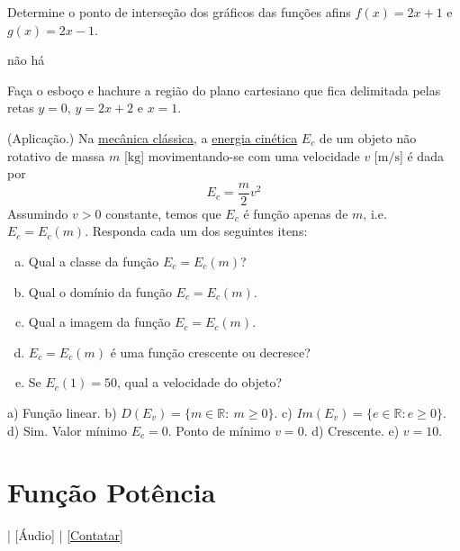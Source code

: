 \begin{exer}
  Determine o ponto de interseção dos gráficos das funções afins $f(x) = 2x + 1$ e $g(x) = 2x -1$.
\end{exer}
\begin{resp}
  não há
\end{resp}

\begin{exer}\label{exer:delim}
  Faça o esboço e hachure a região do plano cartesiano que fica delimitada pelas retas $y=0$, $y=2x+2$ e $x=1$.
\end{exer}

\begin{exer}(Aplicação.)
  Na \href{https://pt.wikipedia.org/wiki/Mec\%C3\%A2nica\_cl\%C3\%A1ssica}{mecânica clássica}, a \href{https://pt.wikipedia.org/wiki/Energia_cin\%C3\%A9tica}{energia cinética} $E_c$ de um objeto não rotativo de massa $m$ [$\text{kg}$] movimentando-se com uma velocidade $v$ [$\text{m}/\text{s}$] é dada por
  \begin{equation}
    E_c = \frac{m}{2}v^2
  \end{equation}
  Assumindo $v>0$ constante, temos que $E_c$ é função apenas de $m$, i.e. $E_c = E_c(m)$. Responda cada um dos seguintes itens:
  \begin{enumerate}[a)]
  \item Qual a classe da função $E_c = E_c(m)$?
  \item Qual o domínio da função $E_c = E_c(m)$.
  \item Qual a imagem da função $E_c = E_c(m)$.
  \item $E_c = E_c(m)$ é uma função crescente ou decresce?
  \item Se $E_c(1) = 50$, qual a velocidade do objeto?
  \end{enumerate}
\end{exer}
\begin{resp}
  a) Função linear. b) $D(E_v) = \{m\in \mathbb{R}:~m\geq 0\}$. c) $Im(E_v) = \{e\in \mathbb{R}: e\geq 0\}$. d) Sim. Valor mínimo $E_c=0$. Ponto de mínimo $v=0$. d) Crescente. e) $v=10$. 
\end{resp}


\section{Função Potência}\label{cap_funcao_sec_funpot}

\begin{flushright}
  [Vídeo] | [Áudio] | \href{https://phkonzen.github.io/notas/contato.html}{[Contatar]}
\end{flushright}

